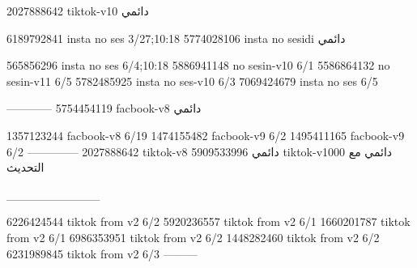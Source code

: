 2027888642 tiktok-v10
دائمي

6189792841 insta no ses
3/27;10:18
5774028106 insta no sesidi
دائمي

565856296 insta no ses
6/4;10:18
5886941148 no sesin-v10
6/1
5586864132 no sesin-v11
6/5
5782485925 insta no ses-v10
6/3
7069424679 insta no ses
6/5

------------
5754454119 facbook-v8
دائمي

1357123244 facbook-v8
6/19
1474155482 facbook-v9
6/2
1495411165 facbook-v9
6/2
--------------
2027888642 tiktok-v8
دائمي
5909533996 tiktok-v1000
دائمي مع التحديث

___________

6226424544 tiktok from v2
6/2
5920236557 tiktok from v2
6/1
1660201787 tiktok from v2
6/1
6986353951 tiktok from v2
6/2
1448282460 tiktok from v2
6/2
6231989845 tiktok from v2
6/3
---------
